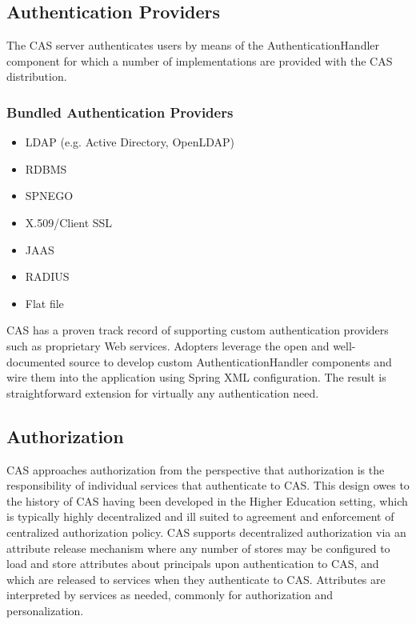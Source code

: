 \documentclass[a4paper]{book}
\begin{document}
\subsection{Authentication Providers}

The CAS server authenticates users by means of the AuthenticationHandler component for which a number of implementations are provided with the CAS distribution.

\subsubsection{Bundled Authentication Providers}

\begin{itemize}
\item
  LDAP (e.g. Active Directory, OpenLDAP)
\item
  RDBMS
\item
  SPNEGO
\item
  X.509/Client SSL
\item
  JAAS
\item
  RADIUS
\item
  Flat file
\end{itemize}
CAS has a proven track record of supporting custom authentication providers such as proprietary Web services. Adopters leverage the open and well-documented source to develop custom AuthenticationHandler components and wire them into the application using Spring XML configuration. The result is straightforward extension for virtually any authentication need.

\subsection{Authorization}

CAS approaches authorization from the perspective that authorization is the responsibility of individual services that authenticate to CAS. This design owes to the history of CAS having been developed in the Higher Education setting, which is typically highly decentralized and ill suited to agreement and enforcement of centralized authorization policy. CAS supports decentralized authorization via an attribute release mechanism where any number of stores may be configured to load and store attributes about principals upon authentication to CAS, and which are released to services when they authenticate to CAS. Attributes are interpreted by services as needed, commonly for authorization and personalization.
\end{document}

